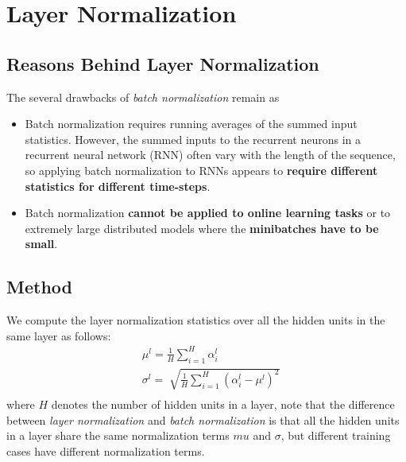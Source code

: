 \documentclass[a3paper, 12pt]{book} %
\begin{document}
\section{Layer Normalization}
\subsection{Reasons Behind Layer Normalization}
The several drawbacks of \emph{batch normalization} remain as 
\begin{itemize}
	\item Batch normalization requires running averages of the summed input statistics. However, the summed inputs to the recurrent neurons in a recurrent neural network (RNN) often vary with the length of the sequence, so applying batch normalization to RNNs appears to \textbf{require different statistics for different time-steps}. 
	\item Batch normalization \textbf{cannot be applied to online learning tasks} or to extremely large distributed models where the \textbf{minibatches have to be small}.
\end{itemize}
\subsection{Method}
We compute the layer normalization statistics over all the hidden units in the same layer as follows:
\begin{equation}
\begin{split}
& \mu^l=\frac{1}{H} \sum_{i=1}^{H}{\alpha_{i}^{l}} \\
& \sigma^l = \sqrt[]{\frac{1}{H} \sum_{i=1}^{H}{(\alpha_{i}^{l}-\mu^l)^2}} \\
\end{split}
\end{equation}
where $H$ denotes the number of hidden units in a layer, note that the difference between \emph{layer normalization} and \emph{batch normalization} is that all the hidden units in a layer share the same normalization terms $mu$ and $\sigma$, but different training cases have different normalization terms. 
\end{document}
